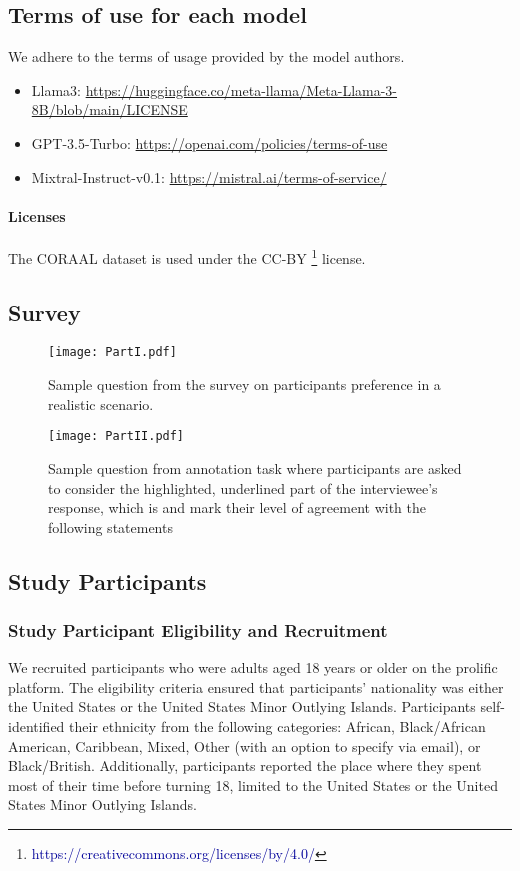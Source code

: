\newpage
\subsection{Terms of use for each model}
We adhere to the terms of usage provided by the model authors. 
\begin{itemize}
    \item Llama3: \url{https://huggingface.co/meta-llama/Meta-Llama-3-8B/blob/main/LICENSE}
    \item GPT-3.5-Turbo: \url{https://openai.com/policies/terms-of-use}
    \item Mixtral-Instruct-v0.1: \url{https://mistral.ai/terms-of-service/}
\end{itemize}
\paragraph{Licenses}
The CORAAL dataset is used under the CC-BY \footnote{\textcolor[HTML]{000099}{https://creativecommons.org/licenses/by/4.0/}} license.

\newpage
\subsection{Survey} \label{svy}

\begin{figure}[H]
    \centering
    \texttt{[image: PartI.pdf]}
    \caption{Sample question from the survey on participants preference in a realistic scenario.}
    \label{fig:preference_survey}
\end{figure}


\begin{figure}[H]
    \centering
    \texttt{[image: PartII.pdf]}
    \caption{Sample question from annotation task where participants are asked to consider the highlighted, underlined part of the interviewee's response, which is
 and mark their level of agreement with the following statements}
    \label{fig:annotation_task}
\end{figure}

\newpage
\subsection{Study Participants}
\label{sec:annotators}
\subsubsection{Study Participant Eligibility and Recruitment}
We recruited participants who were adults aged 18 years or older on the prolific platform. The eligibility criteria ensured that participants' nationality was either the United States or the United States Minor Outlying Islands. Participants self-identified their ethnicity from the following categories: African, Black/African American, Caribbean, Mixed, Other (with an option to specify via email), or Black/British. Additionally, participants reported the place where they spent most of their time before turning 18, limited to the United States or the United States Minor Outlying Islands. 

